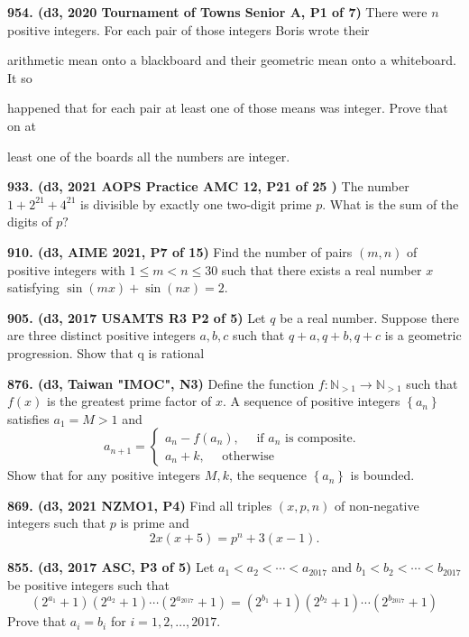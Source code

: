 \documentclass{article}
\begin{document}
\textbf{954. (\color{red}d3\color{black}, 2020 Tournament of Towns Senior A, P1 of 7)} There were $n$ positive integers. For each pair of those integers Boris wrote their

arithmetic mean onto a blackboard and their geometric mean onto a whiteboard. It so

happened that for each pair at least one of those means was integer. Prove that on at

least one of the boards all the numbers are integer.

\textbf{933. (\color{red}d3\color{black}, 2021 AOPS Practice AMC 12, P21 of 25 )} The number $1 + 2^{21} + 4^{21}$ is divisible by exactly one two-digit prime $p.$ What is the sum of the digits of $p?$

\textbf{910. (\color{red}d3\color{black}, AIME 2021, P7 of 15)} Find the number of pairs $(m,n)$ of positive integers with $1 \leq m < n \leq 30$ such that there exists a real number $x$ satisfying $\sin(mx) + \sin(nx) = 2$.

\textbf{905. (\color{red}d3\color{black}, 2017 USAMTS R3 P2 of 5)} Let $q$ be a real number. Suppose
there are three distinct positive integers $a, b, c$ such that $q + a, q + b, q + c$ is a geometric
progression. Show that q is rational

\textbf{876. (\color{red}d3\color{black}, Taiwan "IMOC", N3)} Define the function $f: \mathbb{N}_{>1} \rightarrow \mathbb{N}_{>1}$ such that $f(x)$ is the greatest prime factor of $x$. A sequence of positive integers $\left\{a_{n}\right\}$ satisfies $a_{1}=M>1$ and
$$
    a_{n+1}=\left\{\begin{array}{l}
        a_{n}-f\left(a_{n}\right), \quad \text { if } a_{n} \text { is composite. } \\
        a_{n}+k, \quad \text { otherwise }
    \end{array}\right.
$$
Show that for any positive integers $M, k$, the sequence $\left\{a_{n}\right\}$ is bounded.

\textbf{869. (\color{red}d3\color{black}, 2021 NZMO1, P4)} Find all triples \((x,p,n)\) of non-negative integers such that \(p\) is prime and \[2x(x+5) = p^n + 3(x-1).\]

\textbf{855. (\color{red}d3\color{black}, 2017 ASC, P3 of 5)} Let $a_{1}<a_{2}<\cdots<a_{2017}$ and $b_{1}<b_{2}<\cdots<b_{2017}$ be positive integers such that $$ \left(2^{a_{1}}+1\right)\left(2^{a_{2}}+1\right) \cdots\left(2^{a_{2017}}+1\right)=\left(2^{b_{1}}+1\right)\left(2^{b_{2}}+1\right) \cdots\left(2^{b_{2017}}+1\right) $$ Prove that $a_{i}=b_{i}$ for $i=1,2, \ldots, 2017$.
\end{document}
